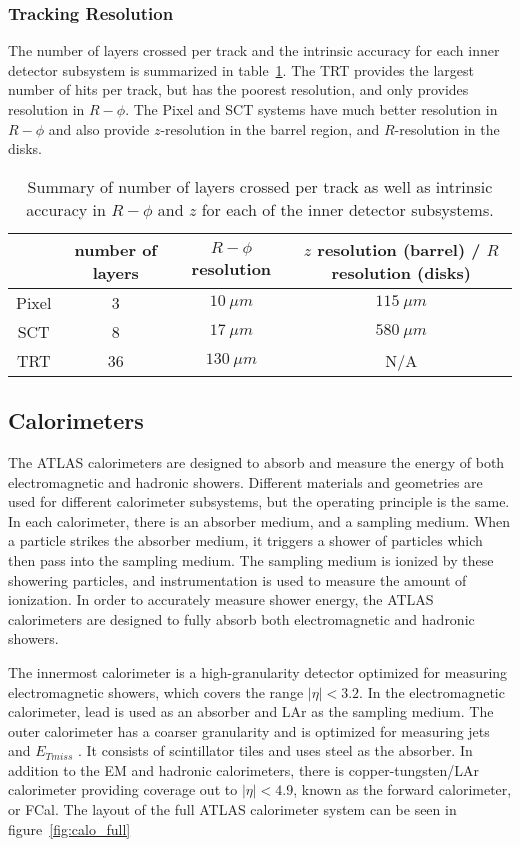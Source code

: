 \subsubsection{Tracking Resolution}
The number of layers crossed per track and the intrinsic accuracy for each inner detector subsystem is summarized in table~\ref{tbl:track_resolution}.
The TRT provides the largest number of hits per track, but has the poorest resolution, and only provides resolution in $R-\phi$.
The Pixel and SCT systems have much better resolution in $R-\phi$ and also provide $z$-resolution in the barrel region, and $R$-resolution in the disks.
\begin{table}[!ht]\centering
\begin{tabular}{cccc}
    \toprule
          & number of layers & $R-\phi$ resolution & $z$ resolution (barrel) / $R$ resolution (disks) \\ \midrule
    Pixel & 3                & $10~\mu m$          & $115~\mu m$ \\
    SCT   & 8                & $17~\mu m$          & $580~\mu m$ \\
    TRT   & 36               & $130~\mu m$         & N/A \\ \bottomrule
\end{tabular}
\caption{Summary of number of layers crossed per track as well as intrinsic accuracy in $R-\phi$ and $z$ for each of the inner detector subsystems.}
\label{tbl:track_resolution}
\end{table}

\subsection{Calorimeters}\label{subsec:calorimeters}

The ATLAS calorimeters are designed to absorb and measure the energy of both electromagnetic and hadronic showers.
Different materials and geometries are used for different calorimeter subsystems, but the operating principle is the same.
In each calorimeter, there is an absorber medium, and a sampling medium.
When a particle strikes the absorber medium, it triggers a shower of particles which then pass into the sampling medium.
The sampling medium is ionized by these showering particles, and instrumentation is used to measure the amount of ionization.
In order to accurately measure shower energy, the ATLAS calorimeters are designed to fully absorb both electromagnetic and hadronic showers.

The innermost calorimeter is a high-granularity detector optimized for measuring electromagnetic showers, which covers the range $|\eta| < 3.2$.
In the electromagnetic calorimeter, lead is used as an absorber and LAr as the sampling medium.
The outer calorimeter has a coarser granularity and is optimized for measuring jets and $E_{T miss}$ .
It consists of scintillator tiles and uses steel as the absorber.
In addition to the EM and hadronic calorimeters, there is copper-tungsten/LAr calorimeter providing coverage out to $|\eta| < 4.9$, known as the forward calorimeter, or FCal.
The layout of the full ATLAS calorimeter system can be seen in figure~\ref{fig:calo_full}

